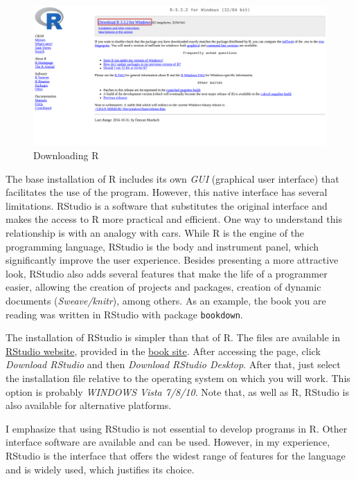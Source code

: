 \documentclass[11pt,]{book}
\begin{document}
\begin{figure}[!htbp]

{\centering \includegraphics[width=1\linewidth]{figs/website_cran_5} 

}

\caption{Downloading R}\label{fig:website-cran-5}
\end{figure}

The base installation of R includes its own \emph{GUI} (graphical user
interface) that facilitates the use of the program. However, this native
interface has several limitations. RStudio is a software that
substitutes the original interface and makes the access to R more
practical and efficient. One way to understand this relationship is with
an analogy with cars. While R is the engine of the programming language,
RStudio is the body and instrument panel, which significantly improve
the user experience. Besides presenting a more attractive look, RStudio
also adds several features that make the life of a programmer easier,
allowing the creation of projects and packages, creation of dynamic
documents (\emph{Sweave/knitr}), among others. As an example, the book
you are reading was written in RStudio with package \texttt{bookdown}.
 

The installation of RStudio is simpler than that of R. The files are
available in \href{https://www.rstudio.com/}{RStudio website}, provided
in the \href{https://sites.google.com/view/pmfdr/home}{book site}. After
accessing the page, click \emph{Download RStudio} and then
\emph{Download RStudio Desktop}. After that, just select the
installation file relative to the operating system on which you will
work. This option is probably \emph{WINDOWS Vista 7/8/10}. Note that, as
well as R, RStudio is also available for alternative platforms.

I emphasize that using RStudio is not essential to develop programs in
R. Other interface software are available and can be used. However, in
my experience, RStudio is the interface that offers the widest range of
features for the language and is widely used, which justifies its
choice.
\end{document}
